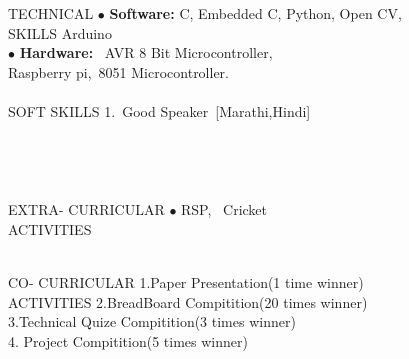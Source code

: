 \documentclass[10pt]{article}
\begin{document}
\begin{flushleft}
	\indent \\ %
	\indent \\	

	\indent TECHNICAL \hspace{0.79in}$\bullet$ \textbf{Software:} C, Embedded C, Python, Open CV,\\ \indent SKILLS \hspace{1.25in}Arduino\\
	\indent   \hspace{1.70in}$\bullet$ \textbf{Hardware:} \ AVR 8 Bit Microcontroller, \\
	 \indent \hspace {1.78in}Raspberry pi,\ 8051 Microcontroller. \\

	\indent \\
	\indent SOFT SKILLS \hspace{0.72in}1.\ Good Speaker\ [Marathi,Hindi]\\

	\indent \\
	\indent \\
	\indent \\
	\indent \\
	\indent EXTRA-
	CURRICULAR \hspace{0.08in}$\bullet$ RSP, \ Cricket\\
	\indent ACTIVITIES %

	\indent \\
	\indent CO-
	CURRICULAR \hspace{0.4in}1.Paper Presentation(1 time winner)\\
	\indent ACTIVITIES \hspace{0.83in}2.BreadBoard Compitition(20 times winner)\\ 
	\indent \hspace{1.7in}3.Technical Quize Compitition(3 times winner)\\
	\indent \hspace{1.7in}4. Project Compitition(5 times winner)\\
    \indent \\
    \indent \\
   

\end{flushleft}
\end{document}
